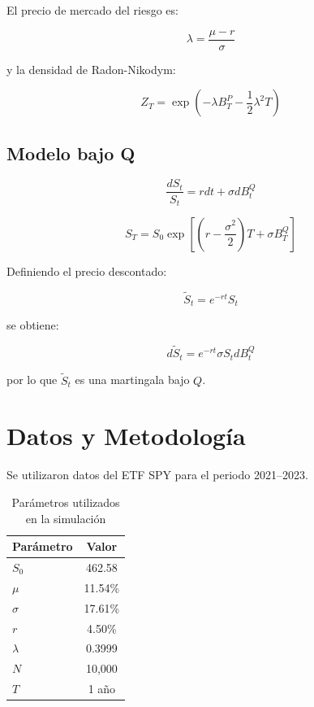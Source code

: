 \documentclass[12pt]{article}
\begin{document}
El precio de mercado del riesgo es:

\begin{equation}
\lambda=\frac{\mu-r}{\sigma}
\end{equation}

y la densidad de Radon-Nikodym:

\begin{equation}
Z_T=\exp\left(-\lambda B_T^P-\frac{1}{2}\lambda^2T\right)
\end{equation}

\subsection{Modelo bajo Q}

\begin{equation}
\frac{dS_t}{S_t}=rdt+\sigma dB_t^Q
\end{equation}

\begin{equation}
S_T=S_0\exp\left[\left(r-\frac{\sigma^2}{2}\right)T+\sigma B_T^Q\right]
\end{equation}

Definiendo el precio descontado:

\begin{equation}
\tilde S_t=e^{-rt}S_t
\end{equation}

se obtiene:

\begin{equation}
d\tilde S_t=e^{-rt}\sigma S_t dB_t^Q
\end{equation}

por lo que $\tilde S_t$ es una martingala bajo $Q$.

\section{Datos y Metodología}

Se utilizaron datos del ETF SPY para el periodo 2021--2023.

\begin{table}[h]
\centering
\begin{tabular}{lc}
\toprule
Parámetro & Valor \\
\midrule
$S_0$ & 462.58 \\
$\mu$ & 11.54\% \\
$\sigma$ & 17.61\% \\
$r$ & 4.50\% \\
$\lambda$ & 0.3999 \\
$N$ & 10,000 \\
$T$ & 1 año \\
\bottomrule
\end{tabular}
\caption{Parámetros utilizados en la simulación}
\end{table}
\end{document}
